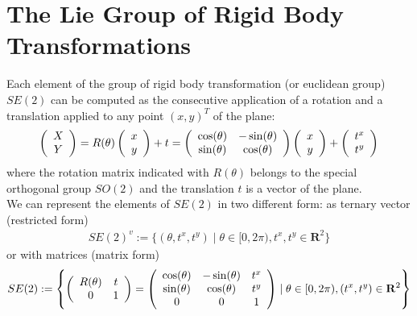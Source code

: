 \section{The Lie Group of Rigid Body Transformations}\label{se:rigid_body_transformations}
Each element of the group of rigid body transformation (or euclidean group) $SE(2)$ can be computed as the consecutive application of a rotation and a translation applied to any point $(x,y)^T$ of the plane:
\begin{align*}
\left (  
\begin{array} {c }
X \\
Y
\end{array}
\right )  
= 
R(\theta)
\left (  
\begin{array} {c }
x \\
y
\end{array}
\right ) 
+
t
=
\left (
\begin{array} {c c }
\cos(\theta) & - \sin(\theta) \\
\sin(\theta) & \cos(\theta) 
\end{array}
\right )
\left (  
\begin{array} {c }
x \\
y
\end{array}
\right ) 
+
\left (  
\begin{array} {c }
t^x \\
t^y
\end{array}
\right ) 
\end{align*}
where the rotation matrix indicated with $R(\theta)$ belongs to the special orthogonal group $SO(2)$ and the translation $t$ is a vector of the plane.\\
We can represent the elements of $SE(2)$ in two different form: as ternary vector (restricted form) 
\begin{align*}
SE(2)^{v} 
:=
\{ (\theta, t^x, t^y) \mid \theta \in [0, 2\pi),   t^x, t^y \in\mathbf{R}^2  \}
\end{align*}
or with matrices (matrix form)
\begin{align*}
SE(2) 
:= 
\left \{
\left (
\begin{array} {c c }
R(\theta) & t \\
0 & 1 
\end{array}
\right )
=
\left (
\begin{array} {c c c }
\cos(\theta) & - \sin(\theta)& t^{x} \\
\sin(\theta) & \cos(\theta) & t^{y}\\
0 & 0 &  1
\end{array}
\right )
\mid
\theta \in  [0, 2\pi), (t^x, t^y) \in\mathbf{R}^2
\right \}
\end{align*}
